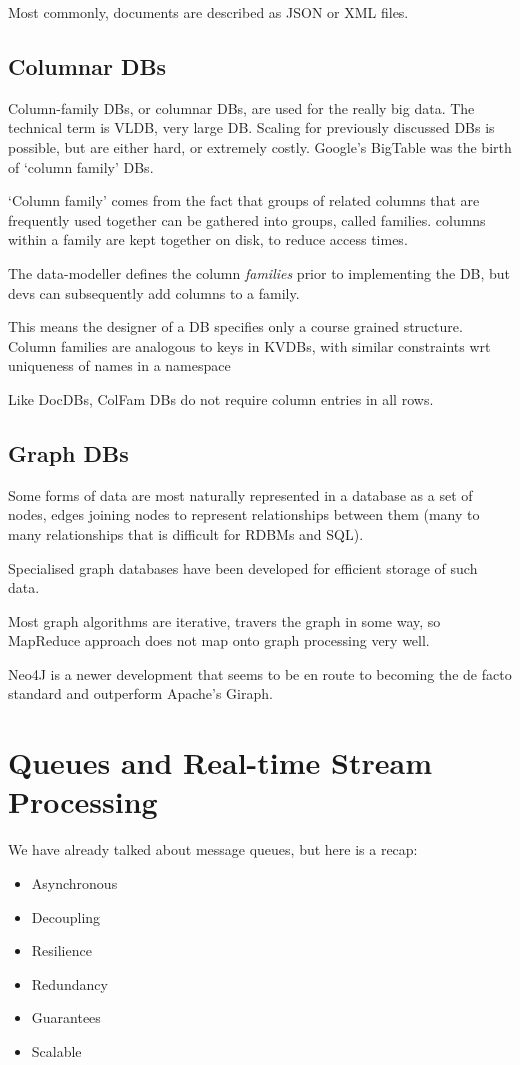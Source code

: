 \documentclass[11pt,a4paper,titlepage,dvipsnames,cmyk]{scrartcl}
\begin{document}
Most commonly, documents are described as JSON or XML files.

\subsection{Columnar DBs}
Column-family DBs, or columnar DBs, are used for the really big data. The technical term is VLDB, very large DB. Scaling for previously discussed DBs is possible, but are either hard, or extremely costly. Google's BigTable was the birth of `column family' DBs.

`Column family' comes from the fact that groups of related columns that are frequently used together can be gathered into groups, called families. columns within a family are kept together on disk, to reduce access times.

The data-modeller defines the column \textit{families} prior to implementing the DB, but devs can subsequently add columns to a family.

This means the designer of a DB specifies only a course grained structure. Column families are analogous to keys in KVDBs, with similar constraints wrt uniqueness of names in a namespace

Like DocDBs, ColFam DBs do not require column entries in all rows.

\subsection{Graph DBs}
Some forms of data are most naturally represented in a database as a set of nodes, edges joining nodes to represent relationships between them (many to many relationships that is difficult for RDBMs and SQL).

Specialised graph databases have been developed for efficient storage of such data.

Most graph algorithms are iterative, travers the graph in some way, so MapReduce approach does not map onto graph processing very well.

Neo4J is a newer development that seems to be en route to becoming the de facto standard and outperform Apache's Giraph. 

\section{Queues and Real-time Stream Processing}
We have already talked about message queues, but here is a recap:
\begin{itemize}
    \item Asynchronous
    \item Decoupling
    \item Resilience
    \item Redundancy
    \item Guarantees
    \item Scalable
\end{itemize}
\end{document}
